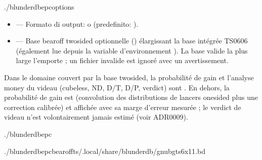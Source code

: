 \documentclass[letterpaper,10pt,italian]{sphinxmanual}
\begin{document}
\begin{sphinxVerbatim}[commandchars=\\\{\}]
./blunderdbepc\PYG{o}{[}options\PYG{o}{]}
\end{sphinxVerbatim}

\sphinxAtStartPar
{}
\begin{itemize}
\item {} 
\sphinxAtStartPar
{} — Formato di output:  o  (predefinito: ).

\item {} 
\sphinxAtStartPar
{} — Base bearoff two\sphinxhyphen{}sided optionnelle () élargissant
la base intégrée TS\sphinxhyphen{}06\sphinxhyphen{}06 (également lue depuis la variable d’environnement
). La base valide la plus large l’emporte ; un fichier
invalide est ignoré avec un avertissement.

\end{itemize}

\sphinxAtStartPar
{} Dans le domaine couvert par la base two\sphinxhyphen{}sided, la probabilité de
gain et l’analyse money du videau (cubeless, ND, D/T, D/P, verdict) sont
. En dehors, la probabilité de gain est  (convolution
des distributions de lancers one\sphinxhyphen{}sided plus une correction calibrée) et
affichée avec sa marge d’erreur mesurée ; le verdict de videau n’est
volontairement jamais estimé (voir ADR\sphinxhyphen{}0009).

\sphinxAtStartPar
{}

\begin{sphinxVerbatim}[commandchars=\\\{\}]
./blunderdbepc

./blunderdbepc\PYGZhy{}\PYGZhy{}bearoff\PYGZhy{}ts\PYGZti{}/.local/share/blunderdb/gnubg\PYGZus{}ts6x11.bd
\end{sphinxVerbatim}
\end{document}
